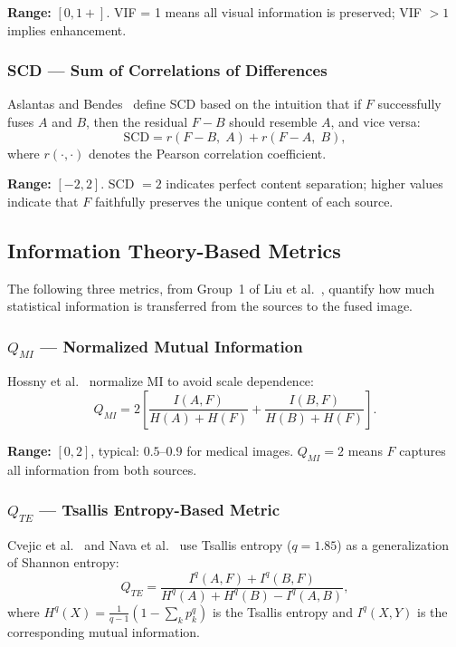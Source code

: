 \documentclass[a4paper,12pt]{article}
\begin{document}
\textbf{Range:} $[0, 1+]$. VIF = 1 means all visual information is preserved;
VIF $> 1$ implies enhancement.

\subsubsection{SCD --- Sum of Correlations of Differences}

Aslantas and Bendes~\cite{aslantas2015} define SCD based on the intuition that
if $F$ successfully fuses $A$ and $B$, then the residual $F - B$ should resemble
$A$, and vice versa:
\begin{equation}
  \text{SCD} = r(F - B,\; A) + r(F - A,\; B),
\end{equation}
where $r(\cdot,\cdot)$ denotes the Pearson correlation coefficient.

\textbf{Range:} $[-2, 2]$.
SCD $= 2$ indicates perfect content separation; higher values indicate
that $F$ faithfully preserves the unique content of each source.

\subsection{Information Theory-Based Metrics}

The following three metrics, from Group~1 of Liu et al.~\cite{liu2012},
quantify how much statistical information is transferred from the sources to
the fused image.

\subsubsection{$Q_{MI}$ --- Normalized Mutual Information}

Hossny et al.~\cite{hossny2008} normalize MI to avoid scale dependence:
\begin{equation}
  Q_{MI} = 2\!\left[\frac{I(A,F)}{H(A)+H(F)} + \frac{I(B,F)}{H(B)+H(F)}\right].
\end{equation}

\textbf{Range:} $[0,2]$, typical: $0.5$--$0.9$ for medical images.
$Q_{MI} = 2$ means $F$ captures all information from both sources.

\subsubsection{$Q_{TE}$ --- Tsallis Entropy-Based Metric}

Cvejic et al.~\cite{cvejic2006} and Nava et al.~\cite{nava2007} use Tsallis
entropy ($q = 1.85$) as a generalization of Shannon entropy:
\begin{equation}
  Q_{TE} = \frac{I^q(A,F) + I^q(B,F)}{H^q(A) + H^q(B) - I^q(A,B)},
\end{equation}
where $H^q(X) = \frac{1}{q-1}\!\left(1 - \sum_k p_k^q\right)$ is the Tsallis
entropy and $I^q(X,Y)$ is the corresponding mutual information.
\end{document}
